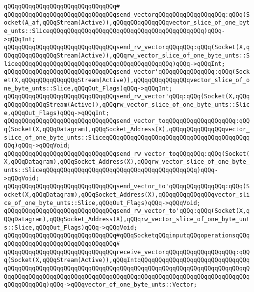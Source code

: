 \verb|qQQqqQQqqQQqqQQqqQQqqQQqqQQqqQQq#|\newline
\verb|qQQqqQQqqQQqqQQqqQQqqQQqqQQqqQQqsend_vectorqQQqqQQqqQQqqQQqqQQq:qQQq(Socket(A_af,qQQqStream(Active)),qQQqqQQqqQQqqQQqvector_slice_of_one_byte_unts::SliceqQQqqQQqqQQqqQQqqQQqqQQqqQQqqQQqqQQqqQQqqQQq)qQQq->qQQqInt;|\newline
\verb|qQQqqQQqqQQqqQQqqQQqqQQqqQQqqQQqsend_rw_vectorqQQqqQQq:qQQq(Socket(X,qQQqqQQqqQQqqQQqStream(Active)),qQQqrw_vector_slice_of_one_byte_unts::SliceqQQqqQQqqQQqqQQqqQQqqQQqqQQqqQQqqQQqqQQqqQQq)qQQq->qQQqInt;|\newline
\verb|qQQqqQQqqQQqqQQqqQQqqQQqqQQqqQQqsend_vector'qQQqqQQqqQQqqQQq:qQQq(Socket(X,qQQqqQQqqQQqqQQqStream(Active)),qQQqqQQqqQQqqQQqvector_slice_of_one_byte_unts::Slice,qQQqOut_Flags)qQQq->qQQqInt;|\newline
\verb|qQQqqQQqqQQqqQQqqQQqqQQqqQQqqQQqsend_rw_vector'qQQq:qQQq(Socket(X,qQQqqQQqqQQqqQQqStream(Active)),qQQqrw_vector_slice_of_one_byte_unts::Slice,qQQqOut_Flags)qQQq->qQQqInt;|\newline
\newline
\verb|qQQqqQQqqQQqqQQqqQQqqQQqqQQqqQQqsend_vector_toqQQqqQQqqQQqqQQqqQQq:qQQq(Socket(X,qQQqDatagram),qQQqSocket_Address(X),qQQqqQQqqQQqqQQqvector_slice_of_one_byte_unts::SliceqQQqqQQqqQQqqQQqqQQqqQQqqQQqqQQqqQQqqQQqqQQq)qQQq->qQQqVoid;|\newline
\verb|qQQqqQQqqQQqqQQqqQQqqQQqqQQqqQQqsend_rw_vector_toqQQqqQQq:qQQq(Socket(X,qQQqDatagram),qQQqSocket_Address(X),qQQqrw_vector_slice_of_one_byte_unts::SliceqQQqqQQqqQQqqQQqqQQqqQQqqQQqqQQqqQQqqQQqqQQq)qQQq->qQQqVoid;|\newline
\verb|qQQqqQQqqQQqqQQqqQQqqQQqqQQqqQQqsend_vector_to'qQQqqQQqqQQqqQQq:qQQq(Socket(X,qQQqDatagram),qQQqSocket_Address(X),qQQqqQQqqQQqqQQqvector_slice_of_one_byte_unts::Slice,qQQqOut_Flags)qQQq->qQQqVoid;|\newline
\verb|qQQqqQQqqQQqqQQqqQQqqQQqqQQqqQQqsend_rw_vector_to'qQQq:qQQq(Socket(X,qQQqDatagram),qQQqSocket_Address(X),qQQqrw_vector_slice_of_one_byte_unts::Slice,qQQqOut_Flags)qQQq->qQQqVoid;|\newline
\newline
\verb|qQQqqQQqqQQqqQQqqQQqqQQqqQQqqQQq#qQQqSocketqQQqinputqQQqoperationsqQQq|\newline
\verb|qQQqqQQqqQQqqQQqqQQqqQQqqQQqqQQq#|\newline
\verb|qQQqqQQqqQQqqQQqqQQqqQQqqQQqqQQqreceive_vectorqQQqqQQqqQQqqQQqqQQq:qQQq(Socket(X,qQQqStream(Active)),qQQqIntqQQqqQQqqQQqqQQqqQQqqQQqqQQqqQQqqQQqqQQqqQQqqQQqqQQqqQQqqQQqqQQqqQQqqQQqqQQqqQQqqQQqqQQqqQQqqQQqqQQqqQQqqQQqqQQqqQQqqQQqqQQqqQQqqQQqqQQqqQQqqQQqqQQqqQQqqQQqqQQqqQQqqQQqqQQqqQQqqQQqqQQq)qQQq->qQQqvector_of_one_byte_unts::Vector;|\newline
